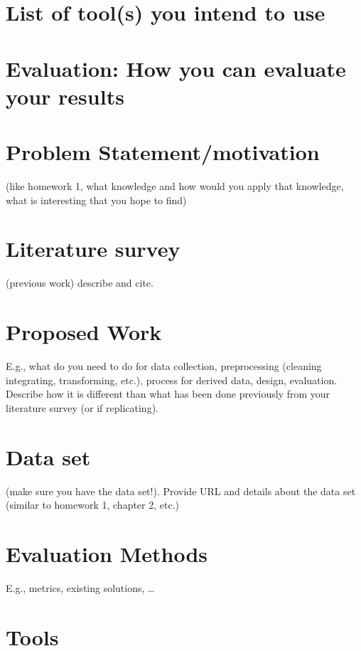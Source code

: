 \section{List of tool(s) you intend to use}
\section{ Evaluation: How you can evaluate your results}

\section{ Problem Statement/motivation}
(like homework 1, what knowledge and how would you apply that knowledge, what is interesting that you hope to find)
\section{Literature survey }
(previous work) describe and cite.
\section{Proposed Work }
E.g., what do you need to do for data collection, preprocessing (cleaning  integrating, transforming, etc.), process for derived data, design, evaluation. Describe how it is different than what has been done previously from your literature survey (or if replicating).
\section{Data set }
(make sure you have the data set!). Provide URL and details about the data set (similar to homework 1, chapter 2, etc.)
\section{ Evaluation Methods }
E.g., metrics, existing solutions, …
\section{Tools}
